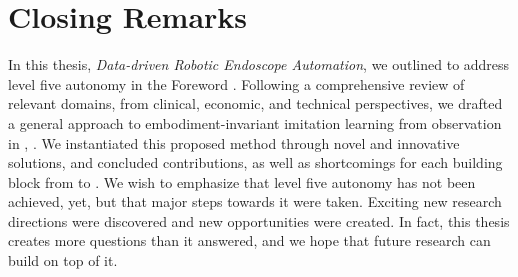 \section{Closing Remarks}
In this thesis, \textit{Data-driven Robotic Endoscope Automation}, we outlined to address level five autonomy in the Foreword . Following a comprehensive review of relevant domains, from clinical, economic, and technical perspectives, we drafted a general approach to embodiment-invariant imitation learning from observation in , . We instantiated this proposed method through novel and innovative solutions, and concluded contributions, as well as shortcomings for each building block from  to . We wish to emphasize that level five autonomy has not been achieved, yet, but that major steps towards it were taken. Exciting new research directions were discovered and new opportunities were created. In fact, this thesis creates more questions than it answered, and we hope that future research can build on top of it.




